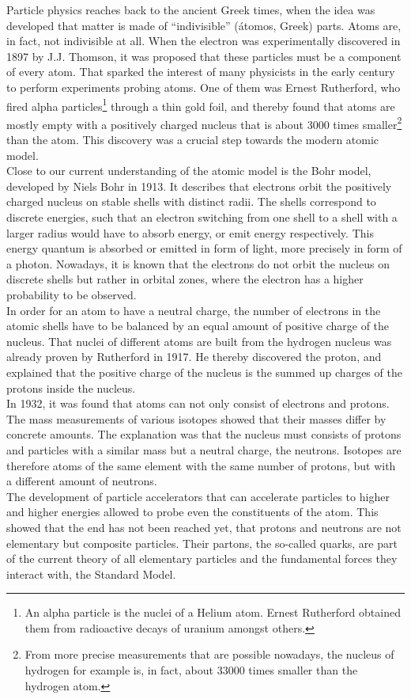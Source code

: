 Particle physics reaches back to the ancient Greek times, when the idea was developed that matter is made of ``indivisible'' (\'atomos, Greek) parts.
Atoms are, in fact, not indivisible at all.
When the electron was experimentally discovered in 1897 by J.J. Thomson, it was proposed that these particles must be a component of every atom.
That sparked the interest of many physicists in the early  century to perform experiments probing atoms.
One of them was Ernest Rutherford, who fired alpha particles\footnote{An alpha particle is the nuclei of a Helium atom. Ernest Rutherford obtained them from radioactive decays of uranium amongst others.} through a thin gold foil, and thereby found that atoms are mostly empty with a positively charged nucleus that is about 3000 times smaller\footnote{From more precise measurements that are possible nowadays, the nucleus of hydrogen for example is, in fact, about \num{33000} times smaller than the hydrogen atom.} than the atom.
This discovery was a crucial step towards the modern atomic model.\\
Close to our current understanding of the atomic model is the Bohr model, developed by Niels Bohr in 1913.
It describes that electrons orbit the positively charged nucleus on stable shells with distinct radii.
The shells correspond to discrete energies, such that an electron switching from one shell to a shell with a larger radius would have to absorb energy, or emit energy respectively.
This energy quantum is absorbed or emitted in form of light, more precisely in form of a photon.
Nowadays, it is known that the electrons do not orbit the nucleus on discrete shells but rather in orbital zones, where the electron has a higher probability to be observed.\\
In order for an atom to have a neutral charge, the number of electrons in the atomic shells have to be balanced by an equal amount of positive charge of the nucleus.
That nuclei of different atoms are built from the hydrogen nucleus was already proven by Rutherford in 1917.
He thereby discovered the proton, and explained that the positive charge of the nucleus is the summed up charges of the protons inside the nucleus.\\
In 1932, it was found that atoms can not only consist of electrons and protons.
The mass measurements of various isotopes showed that their masses differ by concrete amounts.
The explanation was that the nucleus must consists of protons and particles with a similar mass but a neutral charge, the neutrons.
Isotopes are therefore atoms of the same element with the same number of protons, but with a different amount of neutrons.\\
The development of particle accelerators that can accelerate particles to higher and higher energies allowed to probe even the constituents of the atom.
This showed that the end has not been reached yet, that protons and neutrons are not elementary but composite particles.
Their partons, the so-called quarks, are part of the current theory of all elementary particles and the fundamental forces they interact with, the Standard Model.
